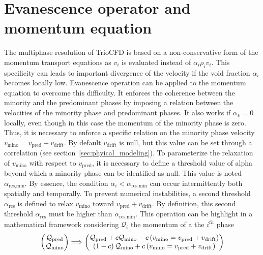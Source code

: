\section{Evanescence operator and momentum equation\label{sec:evan-ope-and-mom}}

The multiphase resolution of TrioCFD is based on a non-conservative form of the momentum transport equations as $v_i$ is evaluated instead of $\alpha_i \rho_i  v_i$. This specificity can leads to important divergence of the velocity if the void fraction $\alpha_i$ becomes locally low.
Evanescence operation can be applied to the momentum equation to overcome this difficulty. 
It enforces the coherence between the minority and the predominant phases by imposing a relation between the velocities of the minority phase and predominant phases. 
It also works if $\alpha_{k} = 0$ locally, even though in this case the momentum of the minority phase is zero. 
Thus, it is necessary to enforce a specific relation on the minority phase velocity $v_{\text{mino}}=v_{\text{pred}}+v_{\text{drift}}$. 
By default $v_{\text{drift}}$ is null, but this value can be set through a correlation (see section~\ref{sec:phyical_modeling}). 
To parameterize the relaxation of $v_{\text{mino}}$ with respect to $v_{\text{pred}}$, it is necessary to define a threshold value of alpha beyond which a minority phase can be identified as null. 
This value is noted $\alpha_{\text{res,min}}$. 
By essence, the condition $\alpha_i<\alpha_{\text{res,min}}$ can occur intermittently both spatially and temporally. 
To prevent numerical instabilities, a second threshold $\alpha_{\text{res}}$ is defined to relax $v_{\text{mino}}$ toward $v_{\text{pred}}+v_{\text{drift}}$. 
By definition, this second threshold $\alpha_{\text{res}}$ must be higher than $\alpha_{\text{res,min}}$. 
This operation can be highlight in a mathematical framework considering $\mathcal{Q}_i$ the momentum of a the $i^{th}$ phase 
\begin{equation}
\label{eq:evanescence_momentum}
\begin{pmatrix}
{\mathcal{Q}_{\text{pred}}}  \\
{\mathcal{Q}_{\text{mino}}}
\end{pmatrix}
\Longrightarrow
\begin{pmatrix}
\mathcal{Q}_{\text{pred}} + c \mathcal{Q}_{\text{mino}} - c \left( v_{\text{mino}}=v_{\text{pred}} + v_{\text{drift}} \right) \\
\left( 1 - c \right) \mathcal{Q}_{\text{mino}} + c \left( v_{\text{mino}}=v_{\text{pred}} + v_{\text{drift}} \right)
\end{pmatrix}
\end{equation}

